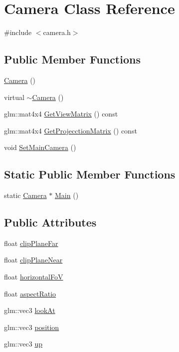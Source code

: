 \hypertarget{class_camera}{}\section{Camera Class Reference}
\label{class_camera}


{\ttfamily \#include $<$camera.\+h$>$}

\subsection*{Public Member Functions}
\begin{DoxyCompactItemize}
\item 
\hyperlink{class_camera_a01f94c3543f56ede7af49dc778f19331}{Camera} ()
\item 
virtual \hyperlink{class_camera_ad1897942d0ccf91052386388a497349f}{$\sim$\+Camera} ()
\item 
glm\+::mat4x4 \hyperlink{class_camera_a4422778e6c46095b523df4d50999fd9c}{Get\+View\+Matrix} () const 
\item 
glm\+::mat4x4 \hyperlink{class_camera_ab1ae18711e7755390de69743008c92e7}{Get\+Projecction\+Matrix} () const 
\item 
void \hyperlink{class_camera_a9283388c9f4749f5bca4465d99841eb4}{Set\+Main\+Camera} ()
\end{DoxyCompactItemize}
\subsection*{Static Public Member Functions}
\begin{DoxyCompactItemize}
\item 
static \hyperlink{class_camera}{Camera} $\ast$ \hyperlink{class_camera_a04e4d14a5dcacef2e6022bed78e1a832}{Main} ()
\end{DoxyCompactItemize}
\subsection*{Public Attributes}
\begin{DoxyCompactItemize}
\item 
float \hyperlink{class_camera_a55581df24efcf3c7435cf34faa96aca6}{clip\+Plane\+Far}
\item 
float \hyperlink{class_camera_aa4d30db62c0140589c1e332d496b142d}{clip\+Plane\+Near}
\item 
float \hyperlink{class_camera_a626d2ed03f88d6a740590117b5c9b72b}{horizontal\+Fo\+V}
\item 
float \hyperlink{class_camera_aa6f013fdb4560daaa5ca6ace1a846ca7}{aspect\+Ratio}
\item 
glm\+::vec3 \hyperlink{class_camera_a4cc07d9240227ef5d11fdaad14822b08}{look\+At}
\item 
glm\+::vec3 \hyperlink{class_camera_a04b5db2c530d8630660e8cfb93a4b3b5}{position}
\item 
glm\+::vec3 \hyperlink{class_camera_a3fe5f351380fb118ffc600591769f049}{up}
\end{DoxyCompactItemize}


